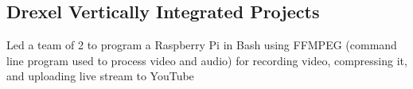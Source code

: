 \documentclass[]{deedy-resume-openfont}
\begin{document}
\begin{minipage}[t]{0.66\textwidth}
    \subsection{Drexel Vertically Integrated Projects}
    \begin{tightemize}
        \item Led a team of 2 to program a Raspberry Pi in Bash using FFMPEG (command line program used to process video and audio) for recording video, compressing it, and uploading live stream to YouTube
    \end{tightemize}
    \sectionsep



\end{minipage}
\end{document}
